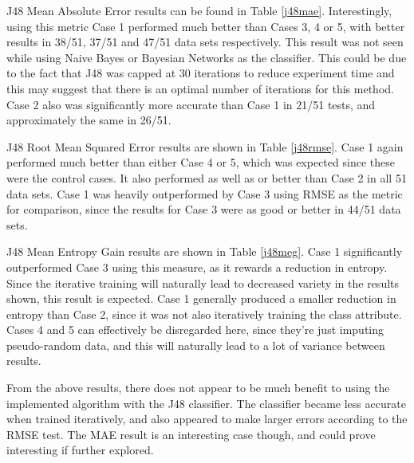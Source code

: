 J48 Mean Absolute Error results can be found in Table \ref{j48mae}. Interestingly, using this metric Case 1 performed much better than Cases 3, 4 or 5, with better results in 38/51, 37/51 and 47/51 data sets respectively. This result was not seen while using Naive Bayes or Bayesian Networks as the classifier. This could be due to the fact that J48 was capped at 30 iterations to reduce experiment time and this may suggest that there is an optimal number of iterations for this method. Case 2 also was significantly more accurate than Case 1 in 21/51 tests, and approximately the same in 26/51.  

J48 Root Mean Squared Error results are shown in Table \ref{j48rmse}. Case 1 again performed much better than either Case 4 or 5, which was expected since these were the control cases. It also performed as well as or better than Case 2 in all 51 data sets. Case 1 was heavily outperformed by Case 3 using RMSE as the metric for comparison, since the results for Case 3 were as good or better in 44/51 data sets.

J48 Mean Entropy Gain results are shown in Table \ref{j48meg}. Case 1 significantly outperformed Case 3 using this measure, as it rewards a reduction in entropy. Since the iterative training will naturally lead to decreased variety in the results shown, this result is expected. Case 1 generally produced a smaller reduction in entropy than Case 2, since it was not also iteratively training the class attribute. Cases 4 and 5 can effectively be disregarded here, since they're just imputing pseudo-random data, and this will naturally lead to a lot of variance between results.

From the above results, there does not appear to be much benefit to using the implemented algorithm with the J48 classifier. The classifier became less accurate when trained iteratively, and also appeared to make larger errors according to the RMSE test. The MAE result is an interesting case though, and could prove interesting if further explored.

